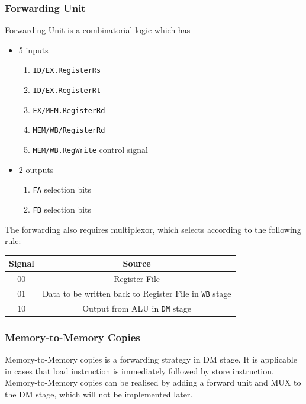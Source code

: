 \documentclass[12pt]{article}
\theoremstyle{definition}
\begin{document}
\subsubsection{Forwarding Unit}
Forwarding Unit is a combinatorial logic which has
\begin{itemize}
  \item 5 inputs
  \begin{enumerate}
    \item \texttt{ID/EX.RegisterRs}
    \item \texttt{ID/EX.RegisterRt}
    \item \texttt{EX/MEM.RegisterRd}
    \item \texttt{MEM/WB/RegisterRd}
    \item \texttt{MEM/WB.RegWrite} control signal
  \end{enumerate}
  \item 2 outputs
  \begin{enumerate}
    \item \texttt{FA} selection bits
    \item \texttt{FB} selection bits
  \end{enumerate}
\end{itemize}
The forwarding also requires multiplexor, which selects according to the following rule:
\begin{table}[h]
\centering
\begin{tabular}{|c|c|}
\hline
Signal&Source\\\hline
00&Register File\\\hline
01&Data to be written back to Register File in \texttt{WB} stage\\\hline
10&Output from ALU in \texttt{DM} stage\\\hline
\end{tabular}
\end{table}
\subsubsection{Memory-to-Memory Copies}
Memory-to-Memory copies is a forwarding strategy in DM stage. It is applicable in cases that load instruction is immediately followed by store instruction.\\
Memory-to-Memory copies can be realised by adding a forward unit and MUX to the DM stage, which will not be implemented later.
\end{document}
